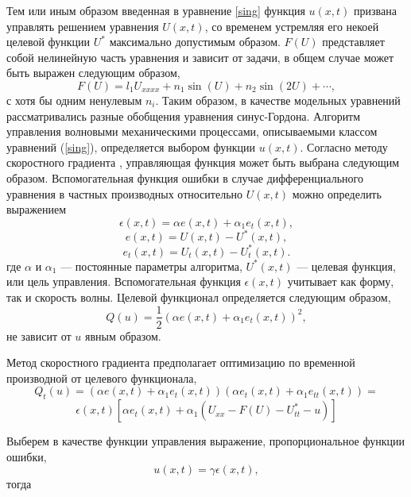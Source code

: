 Тем или иным образом введенная в уравнение \eqref{sing} функция $u(x,t)$ призвана управлять решением уравнения $U(x,t)$, со временем устремляя его некоей целевой функции $U^*$ максимально допустимым образом. $F\left(U\right)$ представляет собой нелинейную часть уравнения и зависит от задачи, в общем случае может быть выражен следующим образом,
$$
F\left(U\right) = l_1 U_{xxxx} + n_1 \sin (U) + n_2 \sin(2 U) + \cdots,
$$
с хотя бы одним ненулевым $n_i$. Таким образом, в качестве модельных уравнений рассматривались разные обобщения уравнения синус-Гордона. Алгоритм управления волновыми механическими процессами, описываемыми классом уравнений (\ref{sing}), определяется выбором функции $u(x,t)$. Согласно методу скоростного градиента \cite{fradkov_rus_speed_grad}, управляющая функция может быть выбрана следующим образом. Вспомогательная функция ошибки в случае дифференциального уравнения в частных производных относительно $U(x,t)$ можно определить выражением
$$
\epsilon(x,t)=\alpha e(x,t)+\alpha_1 e_t(x,t),
$$
$$
e(x,t)=U(x,t)-U^*(x,t),
$$
$$
e_t(x,t)=U_t(x,t)-U^*_t(x,t).
$$
где $\alpha$ и $\alpha_1$ --- постоянные параметры алгоритма, $U^*(x,t)$ --- целевая функция, или цель управления. Вспомогательная функция $\epsilon(x,t)$ учитывает как форму, так и скорость волны. Целевой функционал определяется следующим образом,
\begin{equation}
	Q(u)=\frac{1}{2}(\alpha e(x,t) + \alpha_1 e_t(x,t))^2,
\end{equation}
не зависит от $u$ явным образом.


Метод скоростного градиента предполагает оптимизацию по временной производной от целевого функционала,
$$
Q_t(u) = (\alpha e(x,t) + \alpha_1 e_t(x,t))(\alpha e_t(x,t) + \alpha_1 e_{tt}(x,t)) =
$$
\begin{equation}
	 \epsilon(x,t)\left[\alpha e_t(x,t) + \alpha_1 (U_{xx}-F\left(U\right)-U^*_{tt}-u)\right]
\end{equation}

Выберем в качестве функции управления выражение, пропорциональное функции ошибки,
\begin{equation}
	u(x,t)=\gamma \epsilon(x,t),
	\label{contrP}
\end{equation}
тогда

